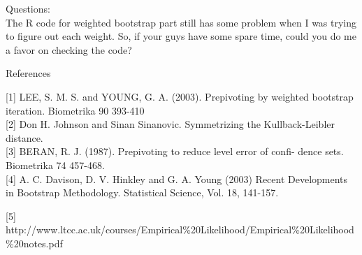 \documentclass[a4paper,11pt]{article}
\begin{document}
Questions:\\
The R code for weighted bootstrap part still has some problem when I was trying to figure out each weight. So, if your guys have some spare time, could you do me a favor on checking the code? 

 
\begin{center}
References
\end{center}

[1] LEE, S. M. S. and YOUNG, G. A. (2003). Prepivoting by weighted bootstrap iteration. Biometrika 90 393-410\\  

[2] Don H. Johnson and Sinan Sinanovic. Symmetrizing the Kullback-Leibler distance.  \\

[3] BERAN, R. J. (1987). Prepivoting to reduce level error of confi- dence sets. Biometrika 74 457-468. \\

[4] A. C. Davison, D. V. Hinkley and G. A. Young (2003) Recent Developments in Bootstrap Methodology. Statistical Science, Vol. 18, 141-157.

[5] http://www.ltcc.ac.uk/courses/Empirical\%20Likelihood/Empirical\%20Likelihood\%20notes.pdf
\end{document}
